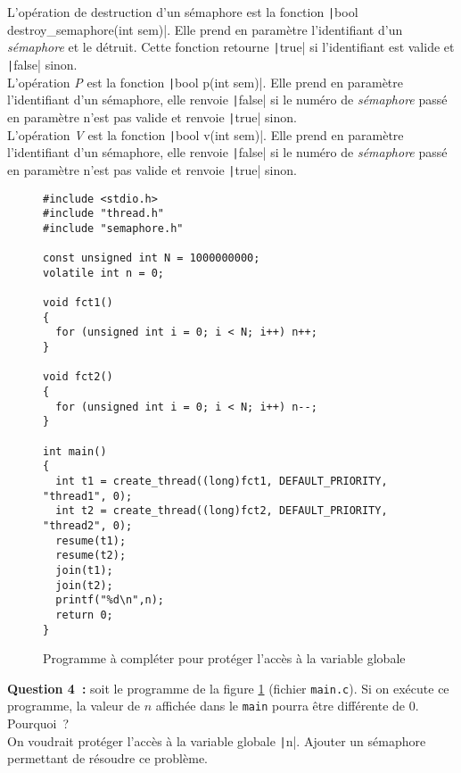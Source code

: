 \documentclass[a4paper]{article}
\begin{document}
L'opération de destruction d'un sémaphore est la fonction 
\texttt|bool destroy_semaphore(int sem)|. Elle prend en paramètre l'identifiant d'un \emph{sémaphore}
et le détruit. Cette fonction retourne \texttt|true| si l'identifiant est valide et \texttt|false| sinon.\\

L'opération \emph{P} est la fonction \texttt|bool p(int sem)|. Elle prend en paramètre l'identifiant d'un 
sémaphore, elle renvoie \texttt|false| si le numéro de \emph{sémaphore} passé en paramètre n'est pas valide et renvoie \texttt|true| sinon.\\

L'opération \emph{V} est la fonction \texttt|bool v(int sem)|. Elle prend en paramètre l'identifiant d'un 
sémaphore, elle renvoie \texttt|false| si le numéro de \emph{sémaphore} passé en paramètre n'est pas valide et renvoie \texttt|true| sinon.\\

\begin{figure}[!htpb]
\begin{verbatim}
#include <stdio.h>
#include "thread.h"
#include "semaphore.h"

const unsigned int N = 1000000000;
volatile int n = 0;

void fct1()
{
  for (unsigned int i = 0; i < N; i++) n++;
}

void fct2()
{
  for (unsigned int i = 0; i < N; i++) n--;
}

int main()
{
  int t1 = create_thread((long)fct1, DEFAULT_PRIORITY, "thread1", 0);
  int t2 = create_thread((long)fct2, DEFAULT_PRIORITY, "thread2", 0);
  resume(t1);
  resume(t2);
  join(t1);
  join(t2);
  printf("%d\n",n);
  return 0;
}
\end{verbatim}
\caption{Programme à compléter pour protéger l'accès à la variable globale}
\label{fig:prog3}
\end{figure}

\textbf{Question 4~:} soit le programme de la figure \ref{fig:prog3} (fichier \verb+main.c+). Si on exécute ce programme, la valeur de $n$ affichée
dans le \verb+main+ pourra être différente de $0$. Pourquoi~?\\
On voudrait protéger l'accès à la variable globale \texttt|n|. Ajouter
un sémaphore permettant de résoudre ce problème.\\
\end{document}
